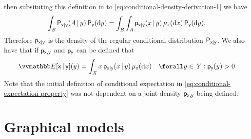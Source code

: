 then subsituting this definition in to \eqref{eq:conditional-density-derivation-1} we have
\begin{equation}\label{eq:conditional-density-derivation-2}
  \int_{\mathit{B}} \mathsf{P}_{\mathsf{x}|\mathsf{y}}(\mathit{A}\operatorname{|} y) \,\mathsf{P}_{\mathsf{y}}(\mathrm{d} y)
  =
  \int_{\mathit{B}}\int_{\mathit{A}} 
    \mathsf{p}_{\mathsf{x}|\mathsf{y}}(x\operatorname{|} y)
  \,\mu_{\mathsf{x}}(\mathrm{d} x)\,\mathsf{P}_{\mathsf{y}}(\mathrm{d} y).
\end{equation}
Therefore $\mathsf{p}_{\mathsf{x}|\mathsf{y}}$ is the density of the regular conditional distribution $\mathsf{P}_{\mathsf{x}|\mathsf{y}}$. We also have that if $\mathsf{p}_{\mathsf{x},\mathsf{y}}$ and $\mathsf{p}_{\mathsf{y}}$ can be defined that 
\begin{equation}\label{eq:conditional-expectation-density}
  \expc{\rvar{x}\gvn\rvar{y}}(y) =
  \int_{\set{X}} x\,\pden{\rvar{x}|\rvar{y}}(x\gvn y) \,\mu_{\rvar{x}}(\dr x)
  \quad \forall y \in \set{Y} : \pden{\rvar{y}}(y) > 0
\end{equation}
Note that the initial definition of conditional expectation in \eqref{eq:conditional-expectation-property} was not dependent on a joint density $\mathsf{p}_{\mathsf{x},\mathsf{y}}$ being defined. %

\section{Graphical models}\label{sec:graphical-models}

